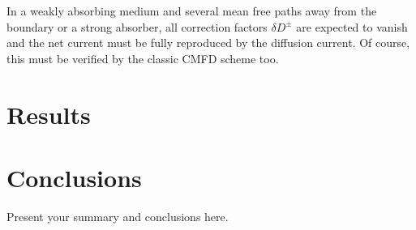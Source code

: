 \documentclass[review,3p,onecolumn,sort&compress]{elsarticle}
\begin{document}
In a weakly absorbing medium and several mean free paths away from the boundary or a strong absorber, all correction factors $\delta D^\pm$ are expected to vanish and the net current must be fully reproduced by the diffusion current. Of course, this must be verified by the classic CMFD scheme too.


\section{Results}
\label{sec:res}


\section{Conclusions}
\label{sec:conc}

Present your summary and conclusions here.




\end{document}
